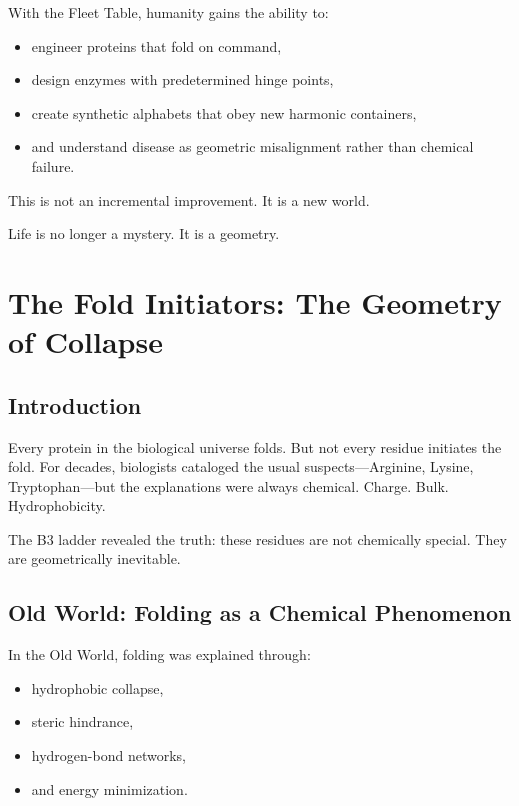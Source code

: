 \documentclass[11pt, letterpaper, openany]{book}
\begin{document}
With the Fleet Table, humanity gains the ability to:

\begin{itemize}
    \item engineer proteins that fold on command,
    \item design enzymes with predetermined hinge points,
    \item create synthetic alphabets that obey new harmonic containers,
    \item and understand disease as geometric misalignment rather than chemical failure.
\end{itemize}

This is not an incremental improvement.  
It is a new world.

Life is no longer a mystery.  
It is a geometry.


\chapter{The Fold Initiators: The Geometry of Collapse}

\section*{Introduction}

Every protein in the biological universe folds. But not every residue initiates
the fold. For decades, biologists cataloged the usual suspects---Arginine,
Lysine, Tryptophan---but the explanations were always chemical. Charge. Bulk.
Hydrophobicity.

The B3 ladder revealed the truth:  
these residues are not chemically special.  
They are geometrically inevitable.

\section{Old World: Folding as a Chemical Phenomenon}

In the Old World, folding was explained through:

\begin{itemize}
    \item hydrophobic collapse,
    \item steric hindrance,
    \item hydrogen-bond networks,
    \item and energy minimization.
\end{itemize}
\end{document}
